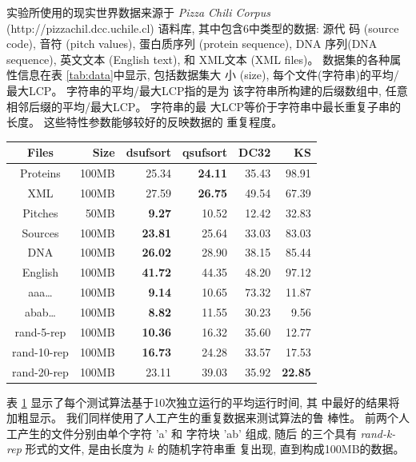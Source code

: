 实验所使用的现实世界数据来源于 \emph{Pizza Chili Corpus}
(http://pizzachil.dcc.uchile.cl) 语料库, 其中包含6中类型的数据: 源代
码 (source code), 音符 (pitch values), 蛋白质序列 (protein sequence),
DNA 序列(DNA sequence), 英文文本 (English text), 和 XML文本 (XML
files)。 数据集的各种属性信息在表 \ref{tab:data}中显示, 包括数据集大
小 (size), 每个文件(字符串)的平均/最大LCP。 字符串的平均/最大LCP指的是为
该字符串所构建的后缀数组中, 任意相邻后缀的平均/最大LCP。 字符串的最
大LCP等价于字符串中最长重复子串的长度。 这些特性参数能够较好的反映数据的
重复程度。

\begin{table}[!htbp]
  \centering
  \renewcommand{\arraystretch}{1.5}
  \begin{tabular}{crrrrr}
    \hline
    Files & Size   & dsufsort  & qsufsort & DC32  & KS\\
    \hline
    Proteins   & 100MB  & 25.34 &\textbf{24.11}    & 35.43 & 98.91\\
    XML        & 100MB  & 27.59 &\textbf{26.75}    & 49.54 & 67.39 \\
    Pitches    & 50MB   &\textbf{9.27 } & 10.52    & 12.42 & 32.83 \\
    Sources    & 100MB  &\textbf{23.81} & 25.64    & 33.03 & 83.03 \\
    DNA        & 100MB  &\textbf{26.02} & 28.90    & 38.15 & 85.44 \\
    English    & 100MB  &\textbf{41.72} & 44.35    & 48.20 & 97.12 \\
    \hline
    aaa\dots    & 100MB  &\textbf{9.14}  & 10.65 & 73.32 & 11.87\\
    abab\dots   & 100MB  &\textbf{8.82}  & 11.55 & 30.23 & 9.56\\
    rand-5-rep  & 100MB   &\textbf{10.36} & 16.32 & 35.60 & 12.77 \\
    rand-10-rep & 100MB   &\textbf{16.73} & 24.28 & 33.57 & 17.53 \\
    rand-20-rep & 100MB   & 23.11 & 39.03 & 35.92  & \textbf{22.85} \\
    \hline
  \end{tabular}
  \label{tab:time}
\end{table}

表 \ref{tab:time} 显示了每个测试算法基于10次独立运行的平均运行时间, 其
中最好的结果将加粗显示。 我们同样使用了人工产生的重复数据来测试算法的鲁
棒性。 前两个人工产生的文件分别由单个字符 'a' 和 字符块 'ab' 组成, 随后
的三个具有 \emph{rand-k-rep} 形式的文件, 是由长度为 $k$ 的随机字符串重
复出现, 直到构成100MB的数据。

